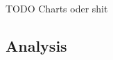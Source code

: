 \documentclass[conference]{IEEEtran}
\begin{document}
\\
\\
\\
\\
\\
\\
\\
\\
\\
\\
\\
\\
\\
\\
\\
\\
\\
\\
\\
\\
\\
\\
\\
\\
\\
\\
\\
\\
\\
\\
\\
\\
\\
\\
\\
\\
\\
\\
\\
\\
\\
\\
\\
\\
\\
\\
\\
\\
\\
\\
\\
\\
\\
\\
TODO Charts oder shit

\subsection{Analysis}
\end{document}
